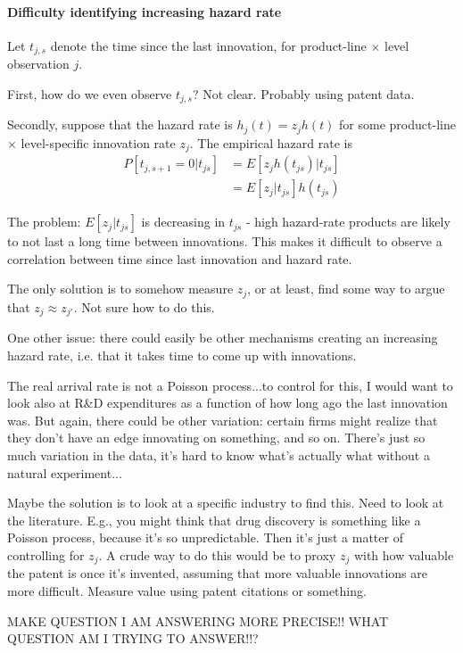\documentclass[12pt,english]{article}
\theoremstyle{remark}
\begin{document}
\paragraph{Difficulty identifying increasing hazard rate}

Let $t_{j,s}$ denote the time since the last innovation, for product-line $\times$ level observation $j$.

First, how do we even observe $t_{j,s}$? Not clear. Probably using patent data.

Secondly, suppose that the hazard rate is $h_j(t) = z_j h(t)$ for some product-line $\times$ level-specific innovation rate $z_j$. The empirical hazard rate is
\begin{align*}
P[t_{j,s+1} = 0|t_{js}] &= E[z_j h(t_{js}) | t_{js}] \\ 
&= E[z_j | t_{js}] h(t_{js})
\end{align*}

The problem: $E[z_j | t_{js}]$ is decreasing in $t_{js}$ - high hazard-rate products are likely to not last a long time between innovations. This makes it difficult to observe a correlation between time since last innovation and hazard rate. 

The only solution is to somehow measure $z_j$, or at least, find some way to argue that $z_j \approx z_{j'}$.  Not sure how to do this.

One other issue: there could easily be other mechanisms creating an increasing hazard rate, i.e. that it takes time to come up with innovations. 

The real arrival rate is not a Poisson process...to control for this, I would want to look also at R\&D expenditures as a function of how long ago the last innovation was. But again, there could be other variation: certain firms might realize that they don't have an edge innovating on something, and so on. There's just so much variation in the data, it's hard to know what's actually what without a natural experiment...

Maybe the solution is to look at a specific industry to find this. Need to look at the literature. E.g., you might think that drug discovery is something like a Poisson process, because it's so unpredictable. Then it's just a matter of controlling for $z_j$. A crude way to do this would be to proxy $z_j$ with how valuable the patent is once it's invented, assuming that more valuable innovations are more difficult. Measure value using patent citations or something. 

MAKE QUESTION I AM ANSWERING MORE PRECISE!!
WHAT QUESTION AM I TRYING TO ANSWER!!?
\end{document}
